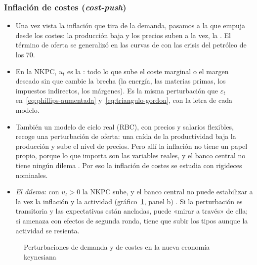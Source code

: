 \documentclass[11pt]{article}
\begin{document}
\subsubsection{Inflación de costes (\emph{cost-push})}\label{sec:costes-push}

\begin{itemize}
\item Una vez vista la inflación que tira de la demanda, pasamos a la que empuja desde los costes: la producción baja y los precios suben a la vez, la . El término de oferta se generalizó en las curvas de  con las crisis del petróleo de los 70\nocite{Gordon2011Phillips}.
\item En la NKPC, $u_t$ es la : todo lo que sube el coste marginal o el margen deseado sin que cambie la brecha (la energía, las materias primas, los impuestos indirectos, los márgenes). Es la misma perturbación que $\varepsilon_t$ en~\eqref{eq:phillips-aumentada} y~\eqref{eq:triangulo-gordon}, con la letra de cada modelo.
\item También un modelo de ciclo real (RBC), con precios y salarios flexibles, recoge una perturbación de oferta: una caída de la productividad baja la producción y sube el nivel de precios. Pero allí la inflación no tiene un papel propio, porque lo que importa son las variables reales, y el banco central no tiene ningún dilema . Por eso la inflación de costes se estudia con rigideces nominales.
\item \emph{El dilema}: con $u_t>0$ la NKPC sube, y el banco central no puede estabilizar a la vez la inflación y la actividad (gráfico~\ref{fig:nek-xpi}, panel b) . Si la perturbación es transitoria y las expectativas están ancladas, puede «mirar a través» de ella; si amenaza con efectos de segunda ronda, tiene que subir los tipos aunque la actividad se resienta.
\end{itemize}

\begin{figure}[H]
\centering
\caption{Perturbaciones de demanda y de costes en la nueva economía keynesiana}\label{fig:nek-xpi}
\end{figure}
\end{document}
